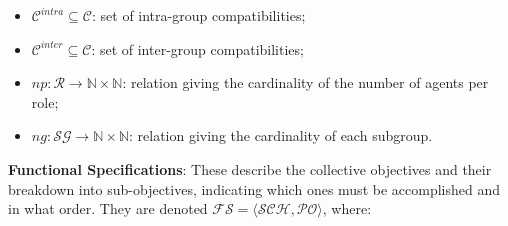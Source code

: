 \begin{itemize}
\begin{itemize}
                  \item $\mathcal{C}^{intra} \subseteq \mathcal{C}$: set of intra-group compatibilities;
                  \item $\mathcal{C}^{inter} \subseteq \mathcal{C}$: set of inter-group compatibilities;
                  \item $np: \mathcal{R} \rightarrow \mathbb{N} \times \mathbb{N}$: relation giving the cardinality of the number of agents per role;
                  \item $ng: \mathcal{SG} \rightarrow \mathbb{N} \times \mathbb{N}$: relation giving the cardinality of each subgroup.
                \end{itemize}
        \end{itemize}

        \medskip

        \noindent \textbf{Functional Specifications}: These describe the collective objectives and their breakdown into sub-objectives, indicating which ones must be accomplished and in what order. They are denoted
        \quad $\mathcal{FS} = \langle \mathcal{SCH}, \mathcal{PO} \rangle$, where:

